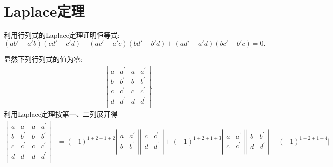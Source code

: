\documentclass[../../main.tex]{subfiles}%
\begin{document}
\section{Laplace定理}

\begin{example}
利用行列式的Laplace定理证明恒等式:
\[
(ab' - a'b)(cd' - c'd)-(ac' - a'c)(bd' - b'd)+(ad' - a'd)(bc' - b'c)=0.
\]
\end{example}
\begin{solution}
显然下列行列式的值为零:
\begin{align*}
\left| \begin{matrix}
a&		a^{\prime}&		a&		a^{\prime}\\
b&		b^{\prime}&		b&		b^{\prime}\\
c&		c^{\prime}&		c&		c^{\prime}\\
d&		d^{\prime}&		d&		d^{\prime}\\
\end{matrix} \right|.
\end{align*}
利用Laplace定理按第一、二列展开得
\begin{align*}
\left| \begin{matrix}
a&		a^{\prime}&		a&		a^{\prime}\\
b&		b^{\prime}&		b&		b^{\prime}\\
c&		c^{\prime}&		c&		c^{\prime}\\
d&		d^{\prime}&		d&		d^{\prime}\\
\end{matrix} \right|&=\left( -1 \right) ^{1+2+1+2}\left| \begin{matrix}
a&		a^{\prime}\\
b&		b^{\prime}\\
\end{matrix} \right|\left| \begin{matrix}
c&		c^{\prime}\\
d&		d^{\prime}\\
\end{matrix} \right|+\left( -1 \right) ^{1+2+1+3}\left| \begin{matrix}
a&		a^{\prime}\\
c&		c^{\prime}\\
\end{matrix} \right|\left| \begin{matrix}
b&		b^{\prime}\\
d&		d^{\prime}\\
\end{matrix} \right|+\left( -1 \right) ^{1+2+1+4}\left| \begin{matrix}

\end{matrix}
\end{align*}
\end{solution}
\end{document}
